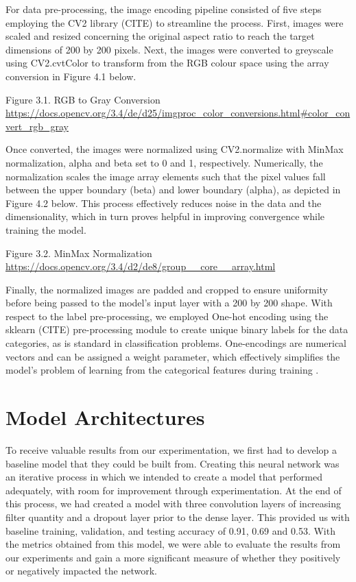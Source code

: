 \documentclass{article}
\begin{document}
For data pre-processing, the image encoding pipeline consisted of five steps employing the CV2 library (CITE) to streamline the process. First, images were scaled and resized concerning the original aspect ratio to reach the target dimensions of 200 by 200 pixels. Next, the images were converted to greyscale using CV2.cvtColor to transform from the RGB colour space using the array conversion in Figure 4.1 below. 


Figure 3.1. RGB to Gray Conversion \url{https://docs.opencv.org/3.4/de/d25/imgproc_color_conversions.html#color_convert_rgb_gray}

Once converted, the images were normalized using CV2.normalize with MinMax normalization, alpha and beta set to 0 and 1, respectively. Numerically, the normalization scales the image array elements such that the pixel values fall between the upper boundary (beta) and lower boundary (alpha), as depicted in Figure 4.2 below. This process effectively reduces noise in the data and the dimensionality, which in turn proves helpful in improving convergence while training the model.

Figure 3.2. MinMax Normalization 
\url{https://docs.opencv.org/3.4/d2/de8/group__core__array.html}

Finally, the normalized images are padded and cropped to ensure uniformity before being passed to the model's input layer with a 200 by 200 shape. With respect to the label pre-processing, we employed One-hot encoding using the sklearn (CITE) pre-processing module to create unique binary labels for the data categories, as is standard in classification problems. One-encodings are numerical vectors and can be assigned a weight parameter, which effectively simplifies the model's problem of learning from the categorical features during training \cite{seger2018investigation}. 



\section{Model Architectures}
To receive valuable results from our experimentation, we first had to develop a baseline model that they could be built from. Creating this neural network was an iterative process in which we intended to create a model that performed adequately, with room for improvement through experimentation. At the end of this process, we had created a model with three convolution layers of increasing filter quantity and a dropout layer prior to the dense layer. This provided us with baseline training, validation, and testing accuracy of 0.91, 0.69 and 0.53. With the metrics obtained from this model, we were able to evaluate the results from our experiments and gain a more significant measure of whether they positively or negatively impacted the network.
\end{document}
